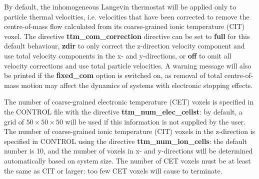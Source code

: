 By default, the inhomogeneous Langevin thermostat will be applied only to
particle thermal velocities, i.e. velocities that have been corrected to
remove the centre-of-mass flow calculated from its coarse-grained ionic
temperature (CIT) voxel. The directive {\bf ttm\_com\_correction} directive
can be set to {\bf full} for this default behaviour, {\bf zdir} to only correct the
z-direction velocity component and use total velocity components in the 
x- and y-directions, or {\bf off} to omit all velocity corrections and use total
particle velocities. A warning message will also be printed if the {\bf fixed\_com} 
option is switched on, as removal of total centre-of-mass motion may affect the
dynamics of systems with electronic stopping effects.

The number of coarse-grained electronic temperature (CET) voxels is
specified in the CONTROL file with the directive {\bf ttm\_num\_elec\_cellst}: by default,
a grid of $50 \times 50 \times 50$ will be used if this information is not
supplied by the user. The number of coarse-grained ionic temperature (CIT)
voxels in the z-direction is specified in CONTROL using the directive
{\bf ttm\_num\_ion\_cells}: the default number is 10, and the number of voxels in x-
and y-directions will be determined automatically based on system size.
The number of CET voxels must be at least the same as CIT or larger:
too few CET voxels will cause \D to terminate.

